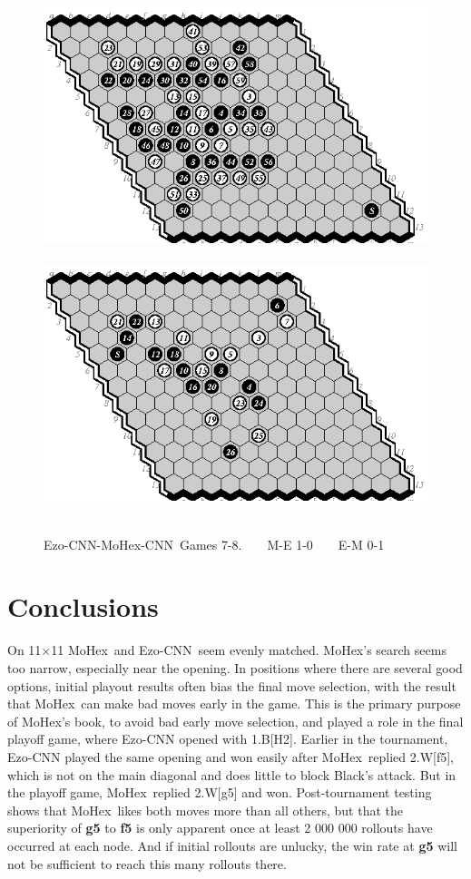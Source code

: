 \documentclass{icga}
\def\Ec{\mbox{\sc Ezo-CNN}}
\def\Mx{\mbox{\sc MoHex}}
\def\Mc{\mbox{\sc MoHex-CNN}}
\begin{document}
\begin{figure}[hbp]
\hfill\includegraphics[scale=1]{pix/13.me7.eps}\hspace*{-2cm}\
\includegraphics[scale=1]{pix/13.em8.eps}\hfill~
\caption{\Ec{}-\Mc\ Games 7-8. ~ ~ M-E 1-0 ~ ~ E-M 0-1}
\end{figure}
\fi

\section{Conclusions}
On 11$\times$11 \Mx\ and \Ec\ seem evenly matched.
\Mx{}'s search seems too narrow, especially near the opening.
In positions where there are several good options,
initial playout results often bias the final move selection,
with the result that \Mx\ can make bad moves early in the game.
This is the primary purpose of \Mx's book, to 
avoid bad early move selection,
and played a role in the final playoff game, where \Ec{} opened 
with 1.B[H2].  Earlier in the tournament, \Ec{} played the same opening
and won easily after \Mx\ replied 2.W[f5], which is not on the main diagonal
and does little to block Black's attack.
But in the playoff game, \Mx\ replied 2.W[g5] and won.
Post-tournament testing shows that \Mx\ likes both moves more than all others,
but that the superiority of {\bf g5} to {\bf f5} is only apparent
once at least 2 000 000 rollouts have occurred at each node.
And if initial rollouts are unlucky, the win rate at {\bf g5} will not
be sufficient to reach this many rollouts there.
\end{document}

